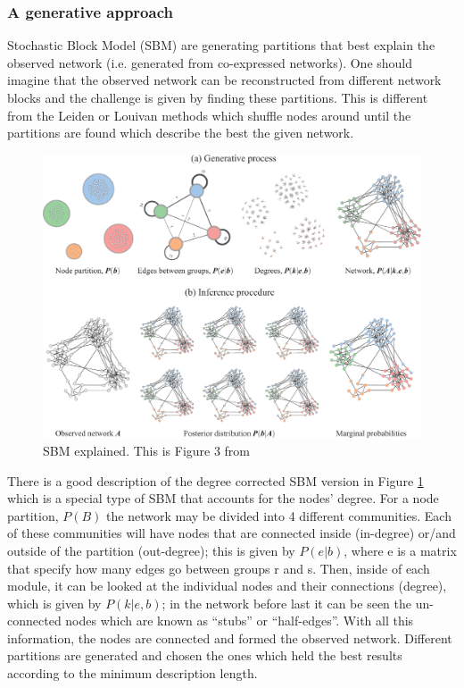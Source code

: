 \subsubsection{A generative approach}


Stochastic Block Model (SBM) are generating partitions that best explain the observed network (i.e. generated from co-expressed networks). One should imagine that the observed network can be reconstructed from different network blocks and the challenge is given by finding these partitions. This is  different from the Leiden or Louivan methods which shuffle nodes around until the partitions are found which describe the best the given network. 

\begin{figure}[!htb]    
    \centering
    \includegraphics[width=1.0\textwidth,height=1.0\textheight,keepaspectratio]{Sections/Network_I/Resources/dc-sbm_explained.png}
    \caption{SBM explained. This is Figure 3 from \citet{Peixoto2021-jx}}
    \label{fig:N_I:dc-sbm_explained}
\end{figure}


There is a good description of the degree corrected SBM version in Figure \ref{fig:N_I:dc-sbm_explained} which is a special type of SBM that accounts for the nodes' degree. For a node partition, $P(B)$ the network may be divided into 4 different communities. Each of these communities will have nodes that are connected inside (in-degree) or/and outside of the partition (out-degree); this is given by $P(e|b)$, where e is a matrix that specify how many edges go between groups r and s. Then, inside of each module, it can be looked at the individual nodes and their connections (degree), which is given by $ P(k|e,b)$; in the network before last it can be seen the un-connected nodes which are known as “stubs” or “half-edges”. With all this information, the nodes are connected and formed the observed network. Different partitions are generated and chosen the ones which held the best results according to the minimum description length.


